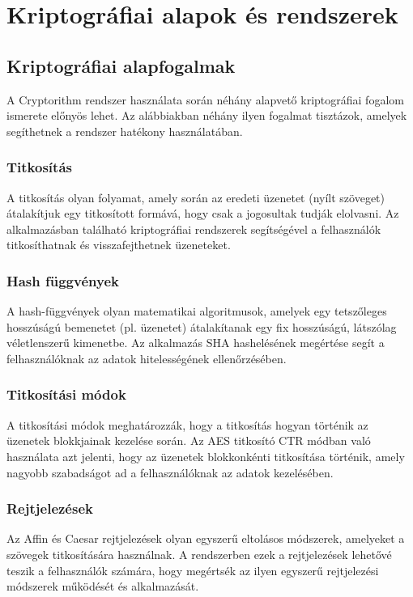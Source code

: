 \chapter{Kriptográfiai alapok és rendszerek}


\section{Kriptográfiai alapfogalmak}
A Cryptorithm rendszer használata során néhány alapvető kriptográfiai fogalom ismerete előnyös lehet. Az alábbiakban néhány ilyen fogalmat tisztázok, amelyek segíthetnek a rendszer hatékony használatában.
\subsection{Titkosítás}
A titkosítás olyan folyamat, amely során az eredeti üzenetet (nyílt szöveget) átalakítjuk egy titkosított formává, hogy csak a jogosultak tudják elolvasni. Az alkalmazásban található kriptográfiai rendszerek segítségével a felhasználók titkosíthatnak és visszafejthetnek üzeneteket.

\subsection{Hash függvények}
A hash-függvények olyan matematikai algoritmusok, amelyek egy tetszőleges hosszúságú bemenetet (pl. üzenetet) átalakítanak egy fix hosszúságú, látszólag véletlenszerű kimenetbe. Az alkalmazás SHA hashelésének megértése segít a felhasználóknak az adatok hitelességének ellenőrzésében.

\subsection{Titkosítási módok}
A titkosítási módok meghatározzák, hogy a titkosítás hogyan történik az üzenetek blokkjainak kezelése során. Az AES titkosító CTR módban való használata azt jelenti, hogy az üzenetek blokkonkénti titkosítása történik, amely nagyobb szabadságot ad a felhasználóknak az adatok kezelésében.

\subsection{Rejtjelezések}
Az Affin és Caesar rejtjelezések olyan egyszerű eltolásos módszerek, amelyeket a szövegek titkosítására használnak. A rendszerben ezek a rejtjelezések lehetővé teszik a felhasználók számára, hogy megértsék az ilyen egyszerű rejtjelezési módszerek működését és alkalmazását.


